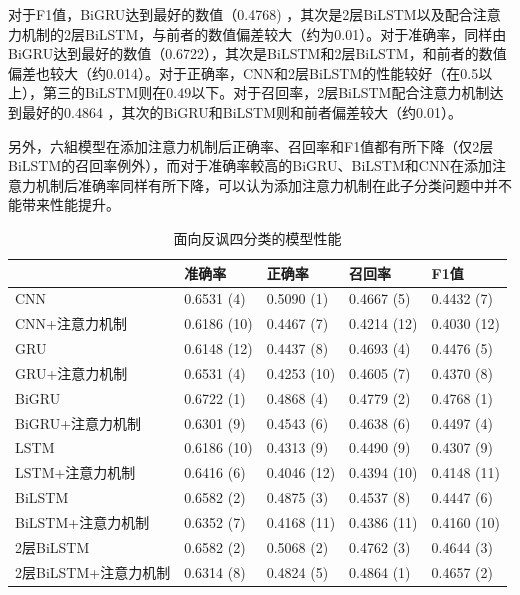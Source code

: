 对于F1值，BiGRU达到最好的数值（0.4768) ，其次是2层BiLSTM以及配合注意力机制的2层BiLSTM，与前者的数值偏差较大（约为0.01）。对于准确率，同样由BiGRU达到最好的数值（0.6722），其次是BiLSTM和2层BiLSTM，和前者的数值偏差也较大（约0.014）。对于正确率，CNN和2层BiLSTM的性能较好（在0.5以上），第三的BiLSTM则在0.49以下。对于召回率，2层BiLSTM配合注意力机制达到最好的0.4864 ，其次的BiGRU和BiLSTM则和前者偏差较大（约0.01）。

另外，六組模型在添加注意力机制后正确率、召回率和F1值都有所下降（仅2层BiLSTM的召回率例外），而对于准确率較高的BiGRU、BiLSTM和CNN在添加注意力机制后准确率同样有所下降，可以认为添加注意力机制在此子分类问题中并不能带来性能提升。

\begin{table}[htb]
  \centering
  \begin{minipage}[t]{\linewidth}
  \caption{面向反讽四分类的模型性能}
  \label{tab:exp_irony_det_B_result}
    \begin{tabularx}{\linewidth}{X|llll}
    \toprule[1.5pt]
    & 准确率 & 正确率 & 召回率 & F1值 \\
    \hline
    CNN & 0.6531 (4) & 0.5090 (1) & 0.4667 (5) & 0.4432 (7) \\ %
    CNN+注意力机制 & 0.6186 (10) & 0.4467 (7) & 0.4214 (12) & 0.4030 (12) \\ %
    \hline
    GRU & 0.6148 (12) & 0.4437 (8) & 0.4693 (4) & 0.4476 (5) \\ %
    GRU+注意力机制 & 0.6531 (4) & 0.4253 (10) & 0.4605 (7) & 0.4370 (8) \\ %
    \hline
    BiGRU & 0.6722 (1) & 0.4868 (4) & 0.4779 (2) & 0.4768 (1) \\ %
    BiGRU+注意力机制 & 0.6301 (9) & 0.4543 (6) & 0.4638 (6) & 0.4497 (4) \\ %
    \hline
    LSTM & 0.6186 (10) & 0.4313 (9) & 0.4490 (9) & 0.4307 (9) \\ %
    LSTM+注意力机制 & 0.6416 (6) & 0.4046 (12) & 0.4394 (10) & 0.4148 (11) \\ %
    \hline
    BiLSTM & 0.6582 (2) & 0.4875 (3) & 0.4537 (8) & 0.4447 (6) \\ %
    BiLSTM+注意力机制 & 0.6352 (7) & 0.4168 (11) & 0.4386 (11) & 0.4160 (10) \\ %
    \hline
    2层BiLSTM & 0.6582 (2) & 0.5068 (2) & 0.4762 (3) & 0.4644 (3) \\ %
    2层BiLSTM+注意力机制 & 0.6314 (8) & 0.4824 (5) & 0.4864 (1) & 0.4657 (2) \\ %
    \bottomrule[1.5pt]
    \end{tabularx}
  \end{minipage}
\end{table}

